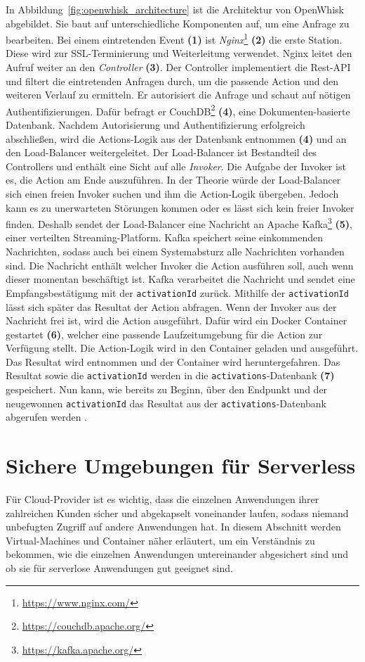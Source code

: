 In Abbildung~\ref{fig:openwhisk_architecture} ist die Architektur von
OpenWhisk abgebildet.
Sie baut auf unterschiedliche Komponenten auf,
um eine Anfrage zu bearbeiten. Bei einem eintretenden Event \textbf{(1)}
ist \emph{Nginx}\footnote{\url{https://www.nginx.com/}} \textbf{(2)} die erste
Station. Diese wird zur SSL-Terminierung und Weiterleitung verwendet.
Nginx leitet den Aufruf weiter an den \emph{Controller} \textbf{(3)}.
Der Controller implementiert die Rest-API und filtert die
eintretenden Anfragen durch, um die passende Action und
den weiteren Verlauf zu ermitteln.
Er autorisiert die Anfrage und schaut auf nötigen Authentifizierungen.
Dafür befragt er CouchDB\footnote{\url{https://couchdb.apache.org/}}
\textbf{(4)},
eine Dokumenten-basierte Datenbank. Nachdem Autorisierung
und Authentifizierung erfolgreich abschließen,
wird die Actions-Logik aus der Datenbank entnommen \textbf{(4)} und an den
Load-Balancer weitergeleitet. Der Load-Balancer ist Bestandteil
des Controllers und enthält eine Sicht auf alle \emph{Invoker}.
Die Aufgabe der Invoker ist es, die Action am Ende auszuführen.
In der Theorie würde der Load-Balancer sich einen freien Invoker suchen
und ihm die Action-Logik übergeben. Jedoch kann es zu unerwarteten
Störungen kommen oder es lässt sich kein freier
Invoker finden. Deshalb sendet der Load-Balancer eine Nachricht an
Apache Kafka\footnote{\url{https://kafka.apache.org/}} \textbf{(5)},
einer verteilten Streaming-Platform. Kafka speichert seine
einkommenden Nachrichten, sodass auch bei einem Systemabsturz alle
Nachrichten vorhanden sind. Die Nachricht enthält welcher
Invoker die Action ausführen soll, auch wenn dieser momentan
beschäftigt ist. Kafka verarbeitet die Nachricht und sendet eine
Empfangsbestätigung mit der \texttt{activationId} zurück. Mithilfe
der \texttt{activationId} lässt sich später das Resultat der Action
abfragen. Wenn der Invoker aus der Nachricht frei ist, wird die
Action ausgeführt. Dafür wird ein Docker Container gestartet \textbf{(6)},
welcher eine passende Laufzeitumgebung für die Action zur Verfügung
stellt. Die Action-Logik wird in den Container geladen und ausgeführt.
Das Resultat wird entnommen und der Container wird heruntergefahren.
Das Resultat sowie die \texttt{activationId} werden in die
\texttt{activations}-Datenbank \textbf{(7)} gespeichert. Nun kann, wie bereits zu Beginn,
über den Endpunkt und der neugewonnen \texttt{activationId} das Resultat aus
der \texttt{activations}-Datenbank abgerufen werden
\cite{OpenWhiskGithub}.

\section{Sichere Umgebungen für Serverless}
Für Cloud-Provider ist es wichtig, dass die einzelnen
Anwendungen ihrer zahlreichen Kunden sicher und abgekapselt
voneinander laufen, sodass niemand unbefugten Zugriff auf
andere Anwendungen hat. In diesem Abschnitt werden
Virtual-Machines und Container näher erläutert, um ein Verständnis zu bekommen,
wie die einzelnen Anwendungen untereinander abgesichert 
sind und ob sie für serverlose Anwendungen gut geeignet sind.

